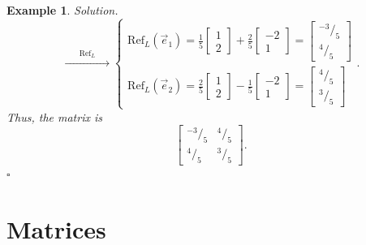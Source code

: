 \documentclass[12pt, a4paper]{article}
\newtheorem{eg}{Example}[subsection]
\newenvironment*{sol}{\indent\textit{Solution. }}{\hfill{$\square$}\par}
\def\vece{\vec{e}}
\begin{document}
\begin{eg}
\begin{sol}
$$\xrightarrow{\ \ \ \ \ \ \ \ \text{Ref}_L\ \ \ \ \ \ \ \ }\begin{cases}\text{Ref}_L(\vece_1)=\frac{1}{5}\begin{bmatrix}1\\2\end{bmatrix}+\frac{2}{5}\begin{bmatrix}-2\\1\end{bmatrix}=\begin{bmatrix}^{-3}/_5\\^4/_5\end{bmatrix}\\\text{Ref}_L(\vece_2)=\frac{2}{5}\begin{bmatrix}1\\2\end{bmatrix}-\frac{1}{5}\begin{bmatrix}-2\\1\end{bmatrix}=\begin{bmatrix}^4/_5\\^3/_5\end{bmatrix}\end{cases}.$$
Thus, the matrix is 
$$\left[\begin{array}{cc}^{-3}/_{5}&^4/_{5}\\ ^{4}/_{5}&^{3}/_{5}\end{array}\right].$$
\end{sol}
\end{eg}

\newpage
\section{Matrices}
\end{document}

